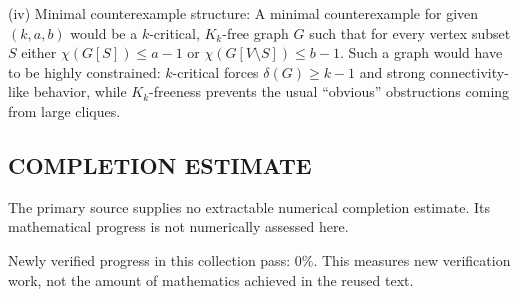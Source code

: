 (iv) Minimal counterexample structure:
A minimal counterexample for given $(k,a,b)$ would be a $k$-critical,
$K_k$-free graph $G$ such that for every vertex subset $S$ either
$\chi(G[S])\le a-1$ or $\chi(G[V\setminus S])\le b-1$.
Such a graph would have to be highly constrained: $k$-critical forces
$\delta(G)\ge k-1$ and strong connectivity-like behavior, while $K_k$-freeness
prevents the usual ``obvious'' obstructions coming from large cliques.




\subsection*{COMPLETION ESTIMATE}
The primary source supplies no extractable numerical completion estimate. Its mathematical progress is not numerically assessed here.

Newly verified progress in this collection pass: $0\%$. This measures new verification work, not the amount of mathematics achieved in the reused text.
